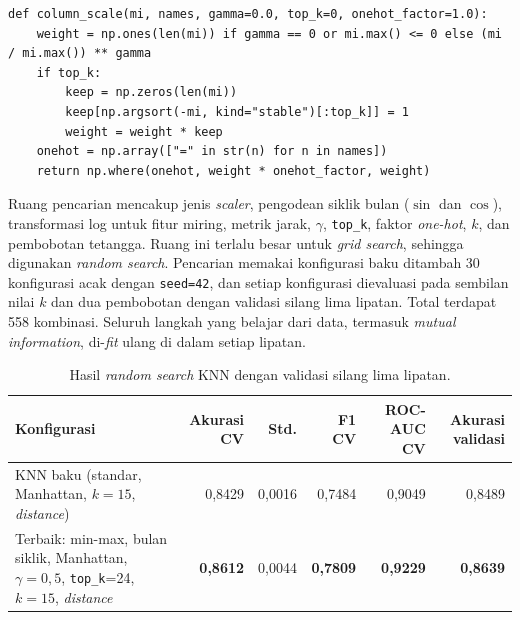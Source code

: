 \begin{lstlisting}[emph={column_scale},caption={Bobot kolom berbasis \textit{mutual information} (\texttt{src/knn\_tuning.py})},label={lst:knn-weight}]
def column_scale(mi, names, gamma=0.0, top_k=0, onehot_factor=1.0):
    weight = np.ones(len(mi)) if gamma == 0 or mi.max() <= 0 else (mi / mi.max()) ** gamma
    if top_k:
        keep = np.zeros(len(mi))
        keep[np.argsort(-mi, kind="stable")[:top_k]] = 1
        weight = weight * keep
    onehot = np.array(["=" in str(n) for n in names])
    return np.where(onehot, weight * onehot_factor, weight)
\end{lstlisting}

Ruang pencarian mencakup jenis \textit{scaler}, pengodean siklik bulan ($\sin$ dan $\cos$), transformasi log untuk fitur miring, metrik jarak, $\gamma$, \texttt{top\_k}, faktor \textit{one-hot}, $k$, dan pembobotan tetangga. Ruang ini terlalu besar untuk \textit{grid search}, sehingga digunakan \textit{random search}. Pencarian memakai konfigurasi baku ditambah 30 konfigurasi acak dengan \texttt{seed=42}, dan setiap konfigurasi dievaluasi pada sembilan nilai $k$ dan dua pembobotan dengan validasi silang lima lipatan. Total terdapat 558 kombinasi. Seluruh langkah yang belajar dari data, termasuk \textit{mutual information}, di-\textit{fit} ulang di dalam setiap lipatan.

\begin{table}[htbp]
    \centering
    \small
    \setlength{\tabcolsep}{4pt}
    \begin{tabularx}{\textwidth}{@{}X r r r r r@{}}
        \toprule
        Konfigurasi & Akurasi CV & Std. & F1 CV & ROC-AUC CV & Akurasi validasi \\
        \midrule
        KNN baku (standar, Manhattan, $k=15$, \textit{distance}) & 0,8429 & 0,0016 & 0,7484 & 0,9049 & 0,8489 \\
        Terbaik: min-max, bulan siklik, Manhattan, $\gamma=0{,}5$, \texttt{top\_k}=24, $k=15$, \textit{distance} & \textbf{0,8612} & 0,0044 & \textbf{0,7809} & \textbf{0,9229} & \textbf{0,8639} \\
        \bottomrule
    \end{tabularx}
    \caption{Hasil \textit{random search} KNN dengan validasi silang lima lipatan.}
    \label{tab:knn-tune}
\end{table}

